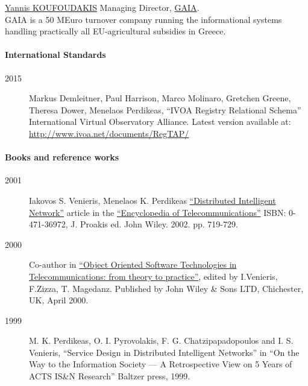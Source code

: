 \documentclass[10pt,a4paper]{article} %
\begin{document}
  \inlineheadsection
      {\href{mailto:i_koufoudakis@c-gaia.gr}{Yannis KOUFOUDAKIS}}
      {Managing Director, \href{https://www.c-gaia.gr/}{GAIA}.
        \\ GAIA is a 50 MEuro turnover company running the informational systems handling
        practically all EU-agricultural subsidies in Greece.}
\fi
\spacedhrule{1.6em}{-0.4em} %



  \paragraph{International Standards}
  \begin{description}
  \item[2015] Markus Demleitner, Paul Harrison, Marco Molinaro, Gretchen Greene, Theresa Dower, Menelaos Perdikeas,
    ``IVOA Registry Relational Schema'' International Virtual Observatory Alliance. Latest version available at:
    \href{http://www.ivoa.net/documents/RegTAP/}{http://www.ivoa.net/documents/RegTAP/}
  \end{description}

  \paragraph{Books and reference works}
  \begin{description}
  \item[2001] Iakovos S. Venieris, Menelaos K. Perdikeas
    \href{http://onlinelibrary.wiley.com/doi/10.1002/0471219282.eot257/full}{``Distributed Intelligent Network''} article in the
    \href{http://eu.wiley.com/WileyCDA/WileyTitle/productCd-0471369721.html}{``Encyclopedia of Telecommunications''} ISBN: 0-471-36972, J. Proakis ed. John Wiley. 2002. pp. 719-729.
  \item[2000] Co-author in \href{http://eu.wiley.com/WileyCDA/WileyTitle/productCd-0471623792.html}{``Object Oriented Software Technologies in Telecommunications: from theory to practice''}, edited by I.Venieris, F.Zizza, T. Magedanz. Published by John Wiley \& Sons LTD, Chichester, UK, April 2000.
  \item[1999] M. K. Perdikeas, O. I. Pyrovolakis, F. G. Chatzipapadopoulos and I. S. Venieris, ``Service Design in Distributed Intelligent Networks'' in ``On the Way to the Information Society --- A Retrospective View on 5 Years of ACTS IS\&N Research'' Baltzer press, 1999.
  \end{description}
\end{document}
